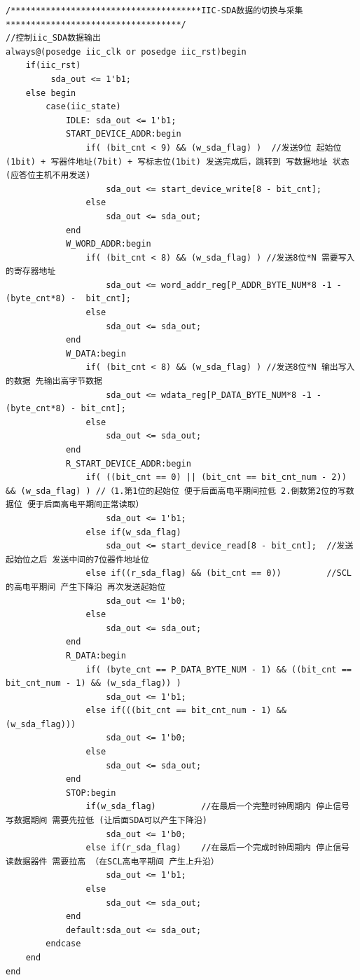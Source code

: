 \documentclass[a4paper,10pt]{article}
\begin{document}
\begin{lstlisting}[caption=iic_drive.v]
/**************************************IIC-SDA数据的切换与采集 ***********************************/
//控制iic_SDA数据输出
always@(posedge iic_clk or posedge iic_rst)begin
    if(iic_rst)
         sda_out <= 1'b1;
    else begin
        case(iic_state)
            IDLE: sda_out <= 1'b1;
            START_DEVICE_ADDR:begin 
                if( (bit_cnt < 9) && (w_sda_flag) )  //发送9位 起始位(1bit) + 写器件地址(7bit) + 写标志位(1bit) 发送完成后，跳转到 写数据地址 状态 (应答位主机不用发送) 
                    sda_out <= start_device_write[8 - bit_cnt];
                else 
                    sda_out <= sda_out;
            end
            W_WORD_ADDR:begin
                if( (bit_cnt < 8) && (w_sda_flag) ) //发送8位*N 需要写入的寄存器地址
                    sda_out <= word_addr_reg[P_ADDR_BYTE_NUM*8 -1 - (byte_cnt*8) -  bit_cnt];
                else 
                    sda_out <= sda_out;
            end
            W_DATA:begin  
                if( (bit_cnt < 8) && (w_sda_flag) ) //发送8位*N 输出写入的数据 先输出高字节数据
                    sda_out <= wdata_reg[P_DATA_BYTE_NUM*8 -1 - (byte_cnt*8) - bit_cnt];
                else 
                    sda_out <= sda_out;
            end
            R_START_DEVICE_ADDR:begin
                if( ((bit_cnt == 0) || (bit_cnt == bit_cnt_num - 2)) && (w_sda_flag) ) //（1.第1位的起始位 便于后面高电平期间拉低 2.倒数第2位的写数据位 便于后面高电平期间正常读取）
                    sda_out <= 1'b1;
                else if(w_sda_flag)  
                    sda_out <= start_device_read[8 - bit_cnt];  //发送起始位之后 发送中间的7位器件地址位
                else if((r_sda_flag) && (bit_cnt == 0))         //SCL的高电平期间 产生下降沿 再次发送起始位
                    sda_out <= 1'b0;
                else 
                    sda_out <= sda_out;
            end
            R_DATA:begin
                if( (byte_cnt == P_DATA_BYTE_NUM - 1) && ((bit_cnt == bit_cnt_num - 1) && (w_sda_flag)) )
                    sda_out <= 1'b1;
                else if(((bit_cnt == bit_cnt_num - 1) && (w_sda_flag))) 
                    sda_out <= 1'b0;
                else
                    sda_out <= sda_out;
            end
            STOP:begin 
                if(w_sda_flag)         //在最后一个完整时钟周期内 停止信号 写数据期间 需要先拉低 (让后面SDA可以产生下降沿) 
                    sda_out <= 1'b0; 
                else if(r_sda_flag)    //在最后一个完成时钟周期内 停止信号 读数据器件 需要拉高 （在SCL高电平期间 产生上升沿）
                    sda_out <= 1'b1;
                else 
                    sda_out <= sda_out;
            end
            default:sda_out <= sda_out;
        endcase
    end
end


\end{lstlisting}
\end{document}
